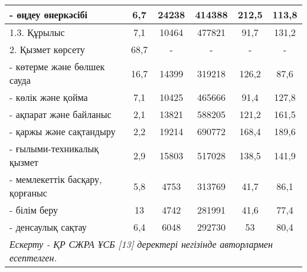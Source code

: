 \begin{table}[H]
{\begin{tabular}{|lccccc|}
\multicolumn{1}{|l|}{- өңдеу өнеркәсібі} &
  \multicolumn{1}{c|}{6,7} &
  \multicolumn{1}{c|}{24238} &
  \multicolumn{1}{c|}{414388} &
  \multicolumn{1}{c|}{212,5} &
  113,8 \\ \hline
\multicolumn{1}{|l|}{1.3. Құрылыс} &
  \multicolumn{1}{c|}{7,1} &
  \multicolumn{1}{c|}{10464} &
  \multicolumn{1}{c|}{477821} &
  \multicolumn{1}{c|}{91,7} &
  131,2 \\ \hline
\multicolumn{1}{|l|}{2. Қызмет көрсету} &
  \multicolumn{1}{c|}{68,7} &
  \multicolumn{1}{c|}{-} &
  \multicolumn{1}{c|}{-} &
  \multicolumn{1}{c|}{-} &
  - \\ \hline
\multicolumn{1}{|l|}{- көтерме және бөлшек сауда} &
  \multicolumn{1}{c|}{16,7} &
  \multicolumn{1}{c|}{14399} &
  \multicolumn{1}{c|}{319218} &
  \multicolumn{1}{c|}{126,2} &
  87,6 \\ \hline
\multicolumn{1}{|l|}{- көлік және қойма} &
  \multicolumn{1}{c|}{7,1} &
  \multicolumn{1}{c|}{10425} &
  \multicolumn{1}{c|}{465666} &
  \multicolumn{1}{c|}{91,4} &
  127,8 \\ \hline
\multicolumn{1}{|l|}{- ақпарат және байланыс} &
  \multicolumn{1}{c|}{2,1} &
  \multicolumn{1}{c|}{13821} &
  \multicolumn{1}{c|}{588205} &
  \multicolumn{1}{c|}{121,2} &
  161,5 \\ \hline
\multicolumn{1}{|l|}{- қаржы және сақтандыру} &
  \multicolumn{1}{c|}{2,2} &
  \multicolumn{1}{c|}{19214} &
  \multicolumn{1}{c|}{690772} &
  \multicolumn{1}{c|}{168,4} &
  189,6 \\ \hline
\multicolumn{1}{|l|}{- ғылыми-техникалық қызмет} &
  \multicolumn{1}{c|}{2,9} &
  \multicolumn{1}{c|}{15803} &
  \multicolumn{1}{c|}{517028} &
  \multicolumn{1}{c|}{138,5} &
  141,9 \\ \hline
\multicolumn{1}{|l|}{- мемлекеттік басқару, қорғаныс} &
  \multicolumn{1}{c|}{5,8} &
  \multicolumn{1}{c|}{4753} &
  \multicolumn{1}{c|}{313769} &
  \multicolumn{1}{c|}{41,7} &
  86,1 \\ \hline
\multicolumn{1}{|l|}{- білім беру} &
  \multicolumn{1}{c|}{13} &
  \multicolumn{1}{c|}{4742} &
  \multicolumn{1}{c|}{281991} &
  \multicolumn{1}{c|}{41,6} &
  77,4 \\ \hline
\multicolumn{1}{|l|}{- денсаулық сақтау} &
  \multicolumn{1}{c|}{6,4} &
  \multicolumn{1}{c|}{6048} &
  \multicolumn{1}{c|}{292730} &
  \multicolumn{1}{c|}{53} &
  80,4 \\ \hline
\multicolumn{6}{|l|}{\textit{Ескерту - ҚР СЖРА ҰСБ {[}13{]} деректері негізінде авторлармен есептелген.}} \\ \hline
\end{tabular}%
}
\end{table}

